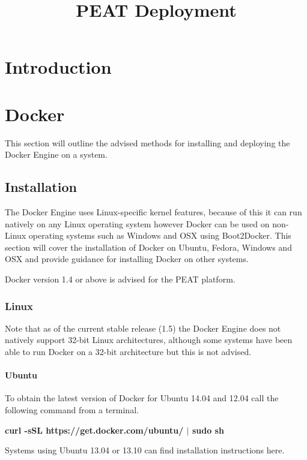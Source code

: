 \documentclass[10pt,a4paper]{article}
\title{PEAT Deployment}
\begin{document}
\maketitle

\section{Introduction}
 


\section{Docker}
This section will outline the advised methods for installing and deploying the Docker Engine on a system.

\subsection{Installation}
The Docker Engine uses Linux-specific kernel features, because of this it can run natively on any Linux operating system however Docker can be used on non-Linux operating systems such as Windows and OSX using Boot2Docker. This section will cover the installation of Docker on Ubuntu, Fedora, Windows and OSX and provide guidance for installing Docker on other systems.

Docker version 1.4 or above is advised for the PEAT platform. 

\subsubsection{Linux}
Note that as of the current stable release (1.5) the Docker Engine does not natively support 32-bit Linux architectures, although some systems have been able to run Docker on a 32-bit architecture but this is not advised.

\newpage

\paragraph{Ubuntu}
To obtain the latest version of Docker for Ubuntu 14.04 and 12.04 call the following command from a terminal.

\centerline{\textbf{curl -sSL https://get.docker.com/ubuntu/ $\vert$ sudo sh}}

Systems using Ubuntu 13.04 or 13.10 can find installation instructions here.
 
\end{document}
